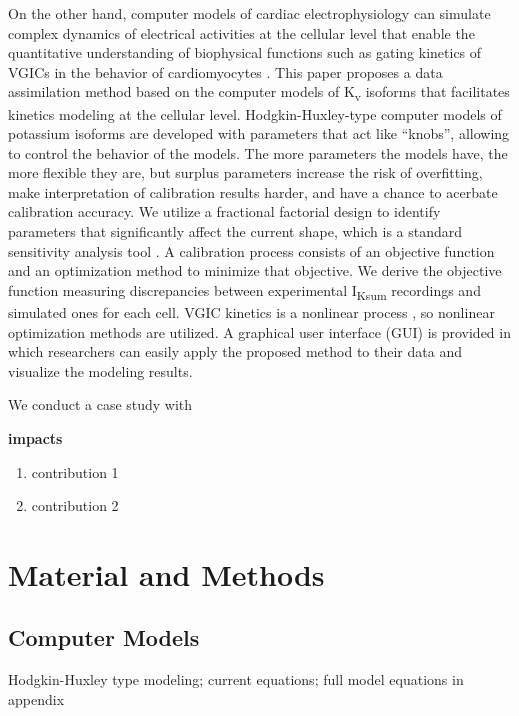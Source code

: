\documentclass[utf8]{frontiersHLTH} %
\begin{document}
On the other hand, computer models of cardiac electrophysiology can simulate complex dynamics of electrical activities at the cellular level that enable the quantitative understanding of biophysical functions such as gating kinetics of VGICs in the behavior of cardiomyocytes \cite{winslow2011integrative}. This paper proposes a data assimilation method based on the computer models of K\textsubscript{v} isoforms that facilitates kinetics modeling at the cellular level. Hodgkin-Huxley-type computer models of potassium isoforms are developed with parameters that act like ``knobs'', allowing to control the behavior of the models. The more parameters the models have, the more flexible they are, but surplus parameters increase the risk of overfitting, make interpretation of calibration results harder, and have a chance to acerbate calibration accuracy. We utilize a fractional factorial design to identify parameters that significantly affect the current shape, which is a standard sensitivity analysis tool \cite{du2015statistical, du2017silico}. A calibration process consists of an objective function and an optimization method to minimize that objective. We derive the objective function measuring discrepancies between experimental I\textsubscript{Ksum} recordings and simulated ones for each cell. VGIC kinetics is a nonlinear process \cite{rudy2006computational}, so nonlinear optimization methods are utilized. A graphical user interface (GUI) is provided in which researchers can easily apply the proposed method to their data and visualize the modeling results. 

We conduct a case study with 

\textbf{impacts}
\begin{enumerate}
    \item contribution 1
    \item contribution 2
\end{enumerate}


\section{Material and Methods}
\subsection{Computer Models}
Hodgkin-Huxley type modeling; current equations; full model equations in appendix
\end{document}
